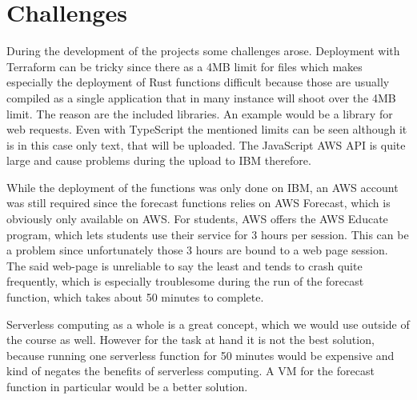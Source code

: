 \chapter{\label{chap:challenges}Challenges}

During the development of the projects some challenges arose. Deployment with
Terraform can be tricky since there as a 4MB limit for files which makes
especially the deployment of Rust functions difficult because those are usually
compiled as a single application that in many instance will shoot over the 4MB
limit. The reason are the included libraries. An example would be a library for
web requests. Even with TypeScript the mentioned limits can be seen although it
is in this case only text, that will be uploaded. The JavaScript AWS API is
quite large and cause problems during the upload to IBM therefore.

While the deployment of the functions was only done on IBM, an AWS account was
still required since the forecast functions relies on AWS Forecast, which is
obviously only available on AWS. For students, AWS offers the AWS Educate
program, which lets students use their service for 3 hours per session. This
can be a problem since unfortunately those 3 hours are bound to a web page
session.  The said web-page is unreliable to say the least and tends to crash
quite frequently, which is especially troublesome during the run of the
forecast function, which takes about 50 minutes to complete.

Serverless computing as a whole is a great concept, which we would use outside
of the course as well. However for the task at hand it is not the best solution,
because running one serverless function for 50 minutes would be expensive and
kind of negates the benefits of serverless computing. A VM for the forecast function
in particular would be a better solution.

